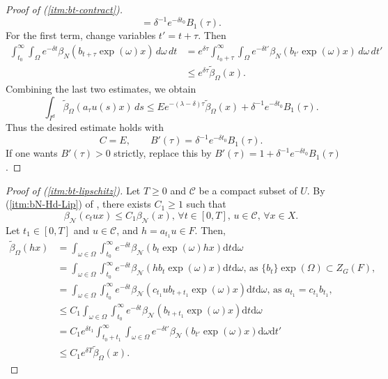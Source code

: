 \documentclass[12pt,reqno]{amsart}
\numberwithin{equation}{section}
\theoremstyle{plain}
\theoremstyle{definition}
\theoremstyle{remark}
\newcommand\cC{\mathcal{C}}
\newcommand\cN{\mathcal{N}}
\newcommand{\de}{\mathrm{d}}
\newcommand{\btt}{\widetilde{\beta}_\Omega}
\newcommand{\bN}{\beta_\cN}
\begin{document}
\begin{proof}[Proof of (\ref{itm:bt-contract})]
\[=
\delta^{-1}e^{-\delta t_0}B_1(\tau).
\]
For the first term, change variables $t'=t+\tau$. Then
\[
\begin{aligned}
\int_{t_0}^{\infty}\int_{\Omega}
e^{-\delta t}
\beta_N\!\left(b_{t+\tau}\exp(\omega)x\right)
\,d\omega\,dt
&=
e^{\delta\tau}
\int_{t_0+\tau}^{\infty}\int_{\Omega}
e^{-\delta t'}
\beta_N\!\left(b_{t'}\exp(\omega)x\right)
\,d\omega\,dt'  \\
&\leq
e^{\delta\tau}\widetilde\beta_\Omega(x).
\end{aligned}
\]
Combining the last two estimates, we obtain
\[
\int_{I^d}\widetilde\beta_\Omega(a_\tau u(s)x)\,ds
\leq
E e^{-(\lambda-\delta)\tau}\widetilde\beta_\Omega(x)
+
\delta^{-1}e^{-\delta t_0}B_1(\tau).
\]
Thus the desired estimate holds with
\[
C=E,
\qquad
B'(\tau)=\delta^{-1}e^{-\delta t_0}B_1(\tau).
\]
If one wants $B'(\tau)>0$ strictly, replace this by
$B'(\tau)=1+\delta^{-1}e^{-\delta t_0}B_1(\tau)$.


\end{proof}

\begin{proof}[Proof of (\ref{itm:bt-lipschitz})] Let $T\geq 0$ and $\cC$ be a compact subset of $U$. By (\ref{itm:bN-Hd-Lip}) of , there exists $C_1\geq 1$ such that
\[
\bN(c_tux)\leq C_1\bN(x), \, \forall t\in [0,T],\, u\in \cC, \, \forall x\in X.
\]
Let $t_1\in [0,T]$ and $u\in \cC$, and $h=a_{t_1}u\in F$. 
Then,
\begin{align*}
\btt(hx) &= \int_{\omega\in\Omega} \int_{t_0}^\infty e^{-\delta t}\bN(b_t\exp(\omega) hx)\de t\de\omega \\
&= \int_{\omega\in\Omega} \int_{t_0}^\infty e^{-\delta t}\bN(hb_t\exp(\omega) x)\de t \de\omega 
\text{, as $\{b_t\}\exp(\Omega)\subset Z_G(F)$,}\\
&=\int_{\omega\in\Omega} \int_{t_0}^\infty e^{-\delta t}\bN(c_{t_1}ub_{t+t_1} \exp(\omega)x)\de t \de\omega
\text{, as $a_{t_1}=c_{t_1}b_{t_1}$,}\\
&\leq C_1 \int_{\omega\in\Omega}\int_{t_0}^\infty e^{-\delta t}\bN(b_{t+t_1} \exp(\omega)x)\de t \de\omega\\
&=C_1 e^{\delta t_1}\int_{t_0+t_1}^\infty \int_{\omega\in\Omega} e^{-\delta t'}\bN(b_{t'}\exp(\omega)x)\de\omega\de t'\\
&\leq C_1e^{\delta T}\btt(x). 
\end{align*}
\end{proof}
\end{document}
